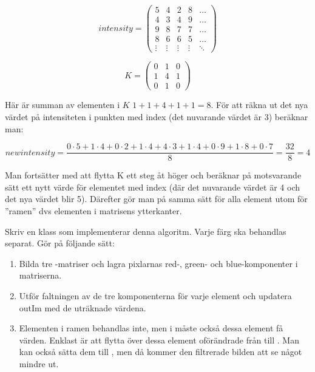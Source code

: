 \begin{minipage}{5cm}
\begin{displaymath}
\mathit{intensity} = \left(
\begin{array}{ccccc}
5 & 4 & 2 & 8 & \ldots \\
4 & 3 & 4 & 9 & \ldots \\
9 & 8 & 7 & 7 & \ldots \\
8 & 6 & 6 & 5 & \ldots \\
\vdots & \vdots & \vdots & \vdots & \ddots
\end{array}
\right)
\end{displaymath}
\end{minipage}\hspace{2cm}
\begin{minipage}{5cm}
\begin{displaymath}
K = \left(
\begin{array}{ccc}
0 & 1 & 0 \\
1 & 4 & 1 \\
0 & 1 & 0
\end{array}
\right)
\end{displaymath}
\end{minipage}

Här är summan av elementen i $K$ $1+1+4+1+1 = 8$. För att räkna ut det nya värdet på intensiteten i punkten med index  (det nuvarande värdet är 3) beräknar man:

\begin{displaymath}
\mathit{newintensity} = \frac{0 \cdot 5 + 1 \cdot 4 + 0 \cdot 2 + 1 \cdot 4 + 4 \cdot 3 + 1 \cdot 4 + 0 \cdot 9 + 1 \cdot 8 + 0 \cdot 7}{8} = \frac{32}{8} = 4
\end{displaymath}


Man fortsätter med att flytta K ett steg åt höger och beräknar på motsvarande sätt ett nytt värde för elementet med index  (där det nuvarande värdet är 4 och det nya värdet blir 5). Därefter gör man på samma sätt för alla element utom för ”ramen” dvs elementen i matrisens ytterkanter.

Skriv en klass  som implementerar denna algoritm. Varje färg ska behandlas separat. Gör på följande sätt:
\begin{enumerate}
	\item Bilda tre -matriser och lagra pixlarnas red-, green- och blue-komponenter i matriserna.
	\item Utför faltningen av de tre komponenterna för varje element och updatera outIm med de uträknade värdena.
	\item Elementen i ramen behandlas inte, men i  måste också dessa element få värden. Enklast är att flytta över dessa element oförändrade från  till . Man kan också sätta dem till , men då kommer den filtrerade bilden att se något mindre ut.
\end{enumerate}

